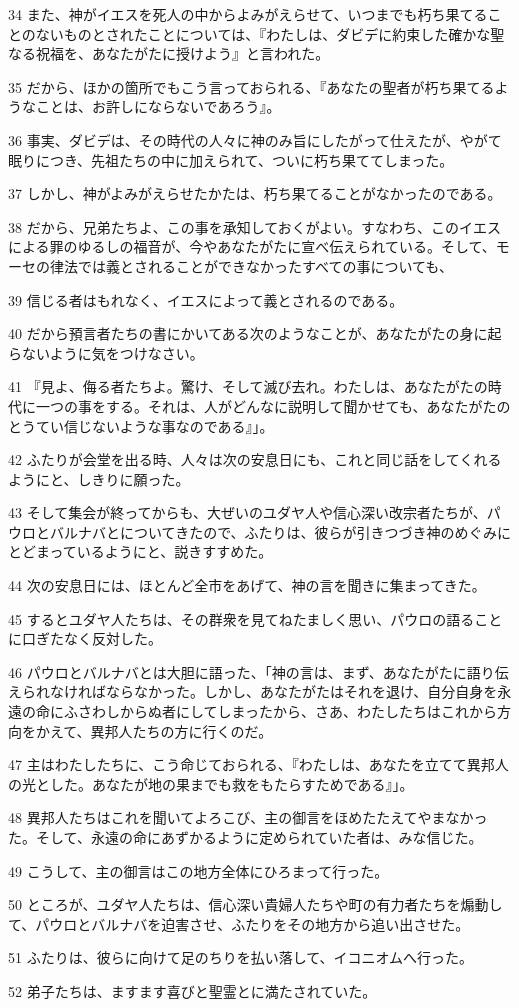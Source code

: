 \par 34 また、神がイエスを死人の中からよみがえらせて、いつまでも朽ち果てることのないものとされたことについては、『わたしは、ダビデに約束した確かな聖なる祝福を、あなたがたに授けよう』と言われた。
\par 35 だから、ほかの箇所でもこう言っておられる、『あなたの聖者が朽ち果てるようなことは、お許しにならないであろう』。
\par 36 事実、ダビデは、その時代の人々に神のみ旨にしたがって仕えたが、やがて眠りにつき、先祖たちの中に加えられて、ついに朽ち果ててしまった。
\par 37 しかし、神がよみがえらせたかたは、朽ち果てることがなかったのである。
\par 38 だから、兄弟たちよ、この事を承知しておくがよい。すなわち、このイエスによる罪のゆるしの福音が、今やあなたがたに宣べ伝えられている。そして、モーセの律法では義とされることができなかったすべての事についても、
\par 39 信じる者はもれなく、イエスによって義とされるのである。
\par 40 だから預言者たちの書にかいてある次のようなことが、あなたがたの身に起らないように気をつけなさい。
\par 41 『見よ、侮る者たちよ。驚け、そして滅び去れ。わたしは、あなたがたの時代に一つの事をする。それは、人がどんなに説明して聞かせても、あなたがたのとうてい信じないような事なのである』」。
\par 42 ふたりが会堂を出る時、人々は次の安息日にも、これと同じ話をしてくれるようにと、しきりに願った。
\par 43 そして集会が終ってからも、大ぜいのユダヤ人や信心深い改宗者たちが、パウロとバルナバとについてきたので、ふたりは、彼らが引きつづき神のめぐみにとどまっているようにと、説きすすめた。
\par 44 次の安息日には、ほとんど全市をあげて、神の言を聞きに集まってきた。
\par 45 するとユダヤ人たちは、その群衆を見てねたましく思い、パウロの語ることに口ぎたなく反対した。
\par 46 パウロとバルナバとは大胆に語った、「神の言は、まず、あなたがたに語り伝えられなければならなかった。しかし、あなたがたはそれを退け、自分自身を永遠の命にふさわしからぬ者にしてしまったから、さあ、わたしたちはこれから方向をかえて、異邦人たちの方に行くのだ。
\par 47 主はわたしたちに、こう命じておられる、『わたしは、あなたを立てて異邦人の光とした。あなたが地の果までも救をもたらすためである』」。
\par 48 異邦人たちはこれを聞いてよろこび、主の御言をほめたたえてやまなかった。そして、永遠の命にあずかるように定められていた者は、みな信じた。
\par 49 こうして、主の御言はこの地方全体にひろまって行った。
\par 50 ところが、ユダヤ人たちは、信心深い貴婦人たちや町の有力者たちを煽動して、パウロとバルナバを迫害させ、ふたりをその地方から追い出させた。
\par 51 ふたりは、彼らに向けて足のちりを払い落して、イコニオムへ行った。
\par 52 弟子たちは、ますます喜びと聖霊とに満たされていた。

